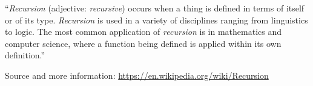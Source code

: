 ``\emph{Recursion} (adjective: \emph{recursive}) occurs when a thing is defined in terms of itself or of its type.
\emph{Recursion} is used in a variety of disciplines ranging from linguistics to logic.
The most common application of \emph{recursion} is in mathematics and computer science, where a function being defined is applied within its own definition.''

Source and more information: \url{https://en.wikipedia.org/wiki/Recursion}